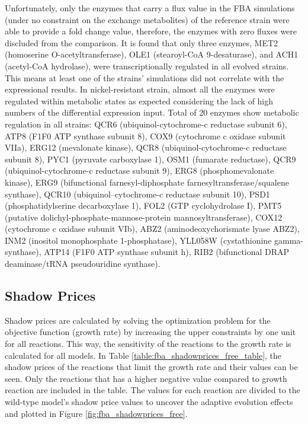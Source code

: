 Unfortunately, only the enzymes that carry a flux value in the FBA simulations (under no constraint on the exchange metabolites) of the reference strain were able to provide a fold change value, therefore, the enzymes with zero fluxes were discluded from the comparison. It is found that only three enzymes, MET2 (homoserine O-acetyltransferase), OLE1 (stearoyl-CoA 9-desaturase), and ACH1 (acetyl-CoA hydrolase), were transcriptionally regulated in all evolved strains. This means at least one of the strains' simulations did not correlate  with the expressional results. In nickel-resistant strain, almost all the enzymes were regulated within metabolic states as expected considering the lack of high numbers of the differential expression input. Total of 20 enzymes show metabolic regulation in all strains: QCR6 (ubiquinol-cytochrome-c reductase subunit 6), ATP8 (F1F0 ATP synthase subunit 8), COX9 (cytochrome c oxidase subunit VIIa), ERG12 (mevalonate kinase), QCR8 (ubiquinol-cytochrome-c reductase subunit 8), PYC1 (pyruvate carboxylase 1), OSM1 (fumarate reductase), QCR9 (ubiquinol-cytochrome-c reductase subunit 9), ERG8 (phosphomevalonate kinase), ERG9 (bifunctional farnesyl-diphosphate farnesyltransferase/squalene synthase), QCR10 (ubiquinol--cytochrome-c reductase subunit 10), PSD1 (phosphatidylserine decarboxylase 1), FOL2 (GTP cyclohydrolase I), PMT5 (putative dolichyl-phosphate-mannose-protein mannosyltransferase), COX12 (cytochrome c oxidase subunit VIb), ABZ2 (aminodeoxychorismate lyase ABZ2), INM2 (inositol monophosphate 1-phosphatase), YLL058W (cystathionine gamma-synthase), ATP14 (F1F0 ATP synthase subunit h), RIB2 (bifunctional DRAP deaminase/tRNA pseudouridine synthase).

\subsection{Shadow Prices}
Shadow prices are calculated by solving the optimization problem for the objective function (growth rate) by increasing the upper constraints by one unit for all reactions. This way, the sensitivity of the reactions to the growth rate is calculated for all models. In Table \ref{table:fba_shadowprices_free_table}, the shadow prices of the reactions that limit the growth rate and their values can be seen. Only the reactions that has a higher negative value compared to growth reaction are included in the table. The values for each reaction are divided to the wild-type model's shadow price values to uncover the adaptive evolution effects and plotted in Figure \ref{fig:fba_shadowprices_free}.

